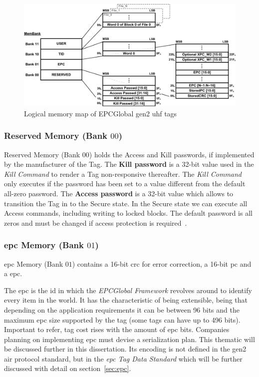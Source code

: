 \begin{figure}[!ht]
    \centering
    \includegraphics[width=\textwidth]{./figs/02-state-of-the-art/logicmemorymap.pdf}
    \caption{Logical memory map of EPCGlobal \ac{gen2} \ac{uhf} tags~\cite{Gs1epcgen2v2uhfairinterfaceI2120180904}} 
    \label{fig:logicalmemorymap}
\end{figure}

\subsubsection{Reserved Memory (Bank $00$)}

Reserved Memory (Bank $00$) holds the Access and Kill passwords, if implemented by the manufacturer of the Tag. 
The \textbf{Kill password} is a 32-bit value used in the \textit{Kill Command} to render a Tag non-responsive thereafter. The \textit{Kill Command} only executes if the password has been set to a value different from the default all-zero password. 
The \textbf{Access password} is a 32-bit value which allows to transition the Tag in to the Secure state. In the Secure state we can execute all Access commands, including writing to locked blocks. The default password is all zeros and must be changed if access protection is required~\cite{RFIDEPCGen2, Gs1epcgen2v2uhfairinterfaceI2120180904}.

\subsubsection{\ac{epc} Memory (Bank $01$)}

\ac{epc} Memory (Bank $01$) contains a 16-bit \ac{crc} for error correction, a 16-bit \ac{pc} and a \ac{epc}.

The \ac{epc} is the \ac{id} in which the \emph{EPCGlobal Framework} revolves around to identify every item in the world. It has the characteristic of being extensible, being that depending on the application requirements it can be between 96 bits and the maximum \ac{epc} size supported by the tag (some tags can have up to 496 bits). Important to refer, tag cost rises with the amount of \ac{epc} bits. Companies planning on implementing \ac{epc} must devise a serialization plan. This thematic will be discussed further in this dissertation.
Its encoding is not defined in the \ac{gen2} air protocol standard, but in the \emph{\ac{epc} Tag Data Standard} which will be further discussed with detail on section~\ref{sec:epc}.

